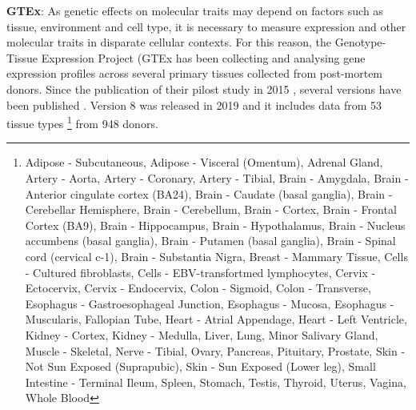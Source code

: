 \textbf{GTEx}:
As genetic effects on molecular traits may depend on factors such as tissue, environment and cell type, it is necessary to measure expression and other molecular traits in disparate cellular contexts. 
For this reason, the Genotype-Tissue Expression Project (GTEx has been collecting and analysing gene expression profiles across several primary tissues collected from post-mortem donors.
Since the publication of their pilost study in 2015 \cite{gtex2015genotype}, several versions have been published \cite{gtex2017genetic, aguet2019gtex}.
Version 8 was released in 2019 and it includes data from 53 tissue types \footnote{Adipose - Subcutaneous, Adipose - Visceral (Omentum), Adrenal Gland, Artery - Aorta, Artery - Coronary, Artery - Tibial, 
Brain - Amygdala, Brain - Anterior cingulate cortex (BA24), Brain - Caudate (basal ganglia), Brain - Cerebellar Hemisphere, Brain - Cerebellum, Brain - Cortex, Brain - Frontal Cortex (BA9), Brain - Hippocampus, Brain - Hypothalamus, Brain - Nucleus accumbens (basal ganglia), Brain - Putamen (basal ganglia), Brain - Spinal cord (cervical c-1), Brain - Substantia Nigra, 
Breast - Mammary Tissue, Cells - Cultured fibroblasts, Cells - EBV-transfortmed lymphocytes,  Cervix - Ectocervix, Cervix - Endocervix, Colon - Sigmoid, Colon - Transverse, Esophagus - Gastroesophageal Junction, Esophagus - Mucosa, Esophagus - Muscularis, Fallopian Tube, Heart - Atrial Appendage, Heart - Left Ventricle, Kidney - Cortex, Kidney - Medulla, Liver, Lung,  Minor Salivary Gland, Muscle - Skeletal, Nerve - Tibial, Ovary, Pancreas, Pituitary, Prostate,  Skin - Not Sun Exposed (Suprapubic), Skin - Sun Exposed (Lower leg), Small Intestine - Terminal Ileum, Spleen, Stomach, Testis, Thyroid, Uterus, Vagina, Whole Blood} from 948 donors.










